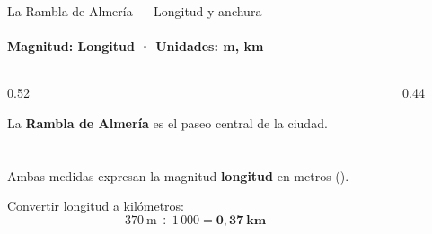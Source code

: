 \documentclass[aspectratio=169, 10pt, spanish]{beamer}
\begin{document}
\begin{frame}{La Rambla de Almería — Longitud y anchura}
  \framesubtitle{Magnitud: Longitud · Unidades: m, km}
  \begin{columns}[c]
    \begin{column}{0.52\textwidth}
      \begin{ejemplobox}
        \AlmFontSmall
        La \textbf{Rambla de Almería} es el paseo central
        de la ciudad.\\[6pt]
        \\
        \\[6pt]
        Ambas medidas expresan la magnitud
        \textbf{longitud} en metros ().
      \end{ejemplobox}
      \vspace{6pt}
      \begin{pasobox}[1]
        \AlmFontFootnote
        Convertir longitud a kilómetros:
        \[
          370\ \text{m} \div 1\,000 = \mathbf{0{,}37\ \text{km}}
        \]
      \end{pasobox}
    \end{column}
    \begin{column}{0.44\textwidth}
    

\end{column}
\end{columns}
\end{frame}
\end{document}
